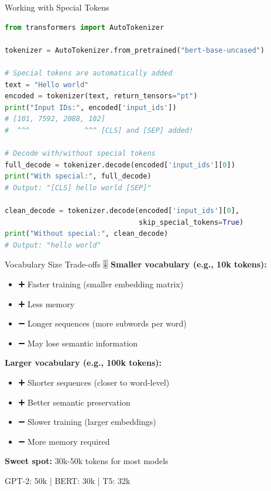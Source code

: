 \documentclass[aspectratio=169]{beamer}
\begin{document}
\begin{frame}[fragile]{Working with Special Tokens 🔧}
    \begin{lstlisting}[language=Python]
from transformers import AutoTokenizer

tokenizer = AutoTokenizer.from_pretrained("bert-base-uncased")

# Special tokens are automatically added
text = "Hello world"
encoded = tokenizer(text, return_tensors="pt")
print("Input IDs:", encoded['input_ids'])
# [101, 7592, 2088, 102]
#  ^^^             ^^^ [CLS] and [SEP] added!

# Decode with/without special tokens
full_decode = tokenizer.decode(encoded['input_ids'][0])
print("With special:", full_decode)
# Output: "[CLS] hello world [SEP]"

clean_decode = tokenizer.decode(encoded['input_ids'][0],
                                skip_special_tokens=True)
print("Without special:", clean_decode)
# Output: "hello world"
    \end{lstlisting}
\end{frame}

\begin{frame}[shrink=10]{Vocabulary Size Trade-offs 🎚️}
    \textbf{Smaller vocabulary (e.g., 10k tokens):}
    \begin{itemize}\setlength{\itemsep}{0pt}
        \item ➕ Faster training (smaller embedding matrix)
        \item ➕ Less memory
        \item ➖ Longer sequences (more subwords per word)
        \item ➖ May lose semantic information
    \end{itemize}

    \vspace{0.5em}
    \textbf{Larger vocabulary (e.g., 100k tokens):}
    \begin{itemize}\setlength{\itemsep}{0pt}
        \item ➕ Shorter sequences (closer to word-level)
        \item ➕ Better semantic preservation
        \item ➖ Slower training (larger embeddings)
        \item ➖ More memory required
    \end{itemize}

    \vspace{0.5em}
    \textbf{Sweet spot:} 30k-50k tokens for most models

    \begin{center}
        GPT-2: 50k | BERT: 30k | T5: 32k
    \end{center}
\end{frame}
\end{document}
